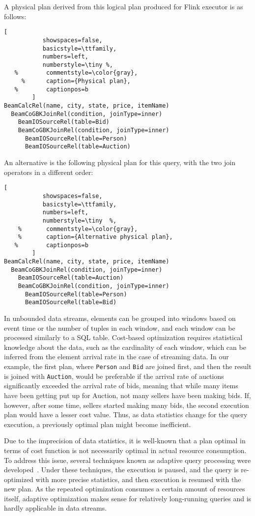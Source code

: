 A physical plan derived from this logical plan produced for Flink executor is as follows:

\begin{lstlisting}[
           showspaces=false,
           basicstyle=\ttfamily,
           numbers=left,
           numberstyle=\tiny %,
   %        commentstyle=\color{gray},
     %      caption={Physical plan}, 
   %        captionpos=b
        ]
BeamCalcRel(name, city, state, price, itemName)
  BeamCoGBKJoinRel(condition, joinType=inner)
    BeamIOSourceRel(table=Bid)
    BeamCoGBKJoinRel(condition, joinType=inner)
      BeamIOSourceRel(table=Person)
      BeamIOSourceRel(table=Auction)
\end{lstlisting}

An alternative is the following physical plan for this query, with the two join operators in a different order:

\begin{lstlisting}[
           showspaces=false,
           basicstyle=\ttfamily,
           numbers=left,
           numberstyle=\tiny  %,
    %       commentstyle=\color{gray},
    %       caption={Alternative physical plan}, 
   %        captionpos=b
        ]
BeamCalcRel(name, city, state, price, itemName)
  BeamCoGBKJoinRel(condition, joinType=inner)
    BeamIOSourceRel(table=Auction)
    BeamCoGBKJoinRel(condition, joinType=inner)
      BeamIOSourceRel(table=Person)
      BeamIOSourceRel(table=Bid)        
\end{lstlisting}


In unbounded data streams, elements can be grouped into windows based on event time or the number of tuples in each window, and each window can be processed similarly to a SQL table. 
Cost-based optimization requires statistical knowledge about the data, such as the cardinality of each window, which can be inferred from the element arrival rate in the case of streaming data. 
In our example, the first plan, where \texttt{Person} and \texttt{Bid} are joined first, and then the result is joined with \texttt{Auction}, would be preferable if the arrival rate of auctions significantly exceeded the arrival rate of bids, meaning that while many items have been getting put up for Auction, not many sellers have been making bids. 
If, however, after some time, sellers started making many bids, the second execution plan would have a lesser cost value. Thus, as data statistics change for the query execution, a previously optimal plan might become inefficient. 

Due to the imprecision of data statistics, it is well-known that a plan optimal in terms of cost function is not necessarily optimal in actual resource consumption. To address this issue, several techniques known as adaptive query processing were developed~\cite{deshpande2007adaptive}. Under these techniques, the execution is paused, and the query is re-optimized with more precise statistics, and then execution is resumed with the new plan. As the repeated optimization consumes a certain amount of resources itself, adaptive optimization makes sense for relatively long-running queries and is hardly applicable in data streams. 

